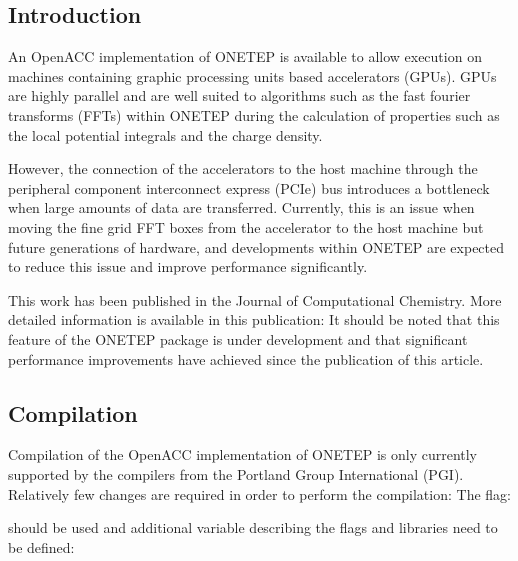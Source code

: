 \documentclass[letterpaper,10pt,english]{sphinxmanual}
\begin{document}
\subsection{Introduction}
\label{\detokenize{ONETEP_OpenACC:introduction}}
An OpenACC implementation of ONETEP is available to allow execution on
machines containing graphic processing units based accelerators (GPUs).
GPUs are highly parallel and are well suited to algorithms such as the
fast fourier transforms (FFTs) within ONETEP during the calculation of
properties such as the local potential integrals and the charge density.

However, the connection of the accelerators to the host machine through
the peripheral component interconnect express (PCIe) bus introduces a
bottleneck when large amounts of data are transferred. Currently, this
is an issue when moving the fine grid FFT boxes from the accelerator to
the host machine but future generations of hardware, and developments
within ONETEP are expected to reduce this issue and improve performance
significantly.

This work has been published in the Journal of Computational Chemistry.
More detailed information is available in this publication:
 It should
be noted that this feature of the ONETEP package is under development
and that significant performance improvements have achieved since the
publication of this article.


\subsection{Compilation}
\label{\detokenize{ONETEP_OpenACC:compilation}}
Compilation of the OpenACC implementation of ONETEP is only currently
supported by the compilers from the Portland Group International (PGI).
Relatively few changes are required in order to perform the compilation:
The flag:

%
\begin{sphinxVerbatim}[commandchars=\\\{\}]
\end{sphinxVerbatim}

should be used and additional variable describing the flags and
libraries need to be defined:

%
\begin{sphinxVerbatim}[commandchars=\\\{\}]
   
   
\end{sphinxVerbatim}
\end{document}
